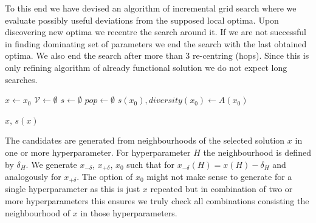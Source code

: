  To this end we have devised an algorithm of incremental grid search where we evaluate possibly useful deviations from the supposed local optima. Upon discovering new optima we recentre the search around it. If we are not successful in finding dominating set of parameters we end the search with the last obtained optima. We also end the search after more than 3 re-centring (hops).  Since this is only refining algorithm of already functional solution we do not expect long searches.


\begin{algorithm}[H]
	\caption{Incremental grid search general}
	\label{alg:incrGS}
	\SetAlgoNoEnd
	
	
	$x \leftarrow x_0$\;
	$\mathcal{V} \leftarrow \emptyset$\;
	$ s \leftarrow  \emptyset$ \;
	$ pop \leftarrow  \emptyset$ \;
	$s(x_0), diversity(x_0) \leftarrow A(x_0)$\; 
	
	\Return $x$, $ s(x) $\;
	
\end{algorithm}


The candidates are generated from neighbourhoods of the selected solution $ x $ in one or more hyperparameter. For hyperparameter $ H $ the neighbourhood is defined by $ \delta_H $. We generate $ x_{-\delta}$, $ x_{+\delta}$, $ x_0 $ such that for  $ x_{-\delta}(H) = x(H) -  \delta_H $ and analogously for $ x_{+\delta}$. The option of $ x_0 $ might not make sense to generate for a single hyperparameter as this is just $ x $ repeated but in combination of two or more hyperparameters this ensures we truly check all combinations consisting the neighbourhood of $ x $ in those hyperparameters.

